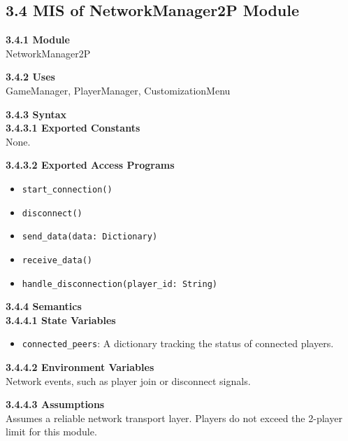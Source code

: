 \documentclass[12pt, titlepage]{article}
\begin{document}
\subsection*{3.4 MIS of NetworkManager2P Module}
\textbf{3.4.1 Module}\\
NetworkManager2P

\textbf{3.4.2 Uses}\\
GameManager, PlayerManager, CustomizationMenu

\textbf{3.4.3 Syntax}\\
\textbf{3.4.3.1 Exported Constants}\\
None.  

\textbf{3.4.3.2 Exported Access Programs}
\begin{itemize}
    \item \texttt{start\_connection()}
    \item \texttt{disconnect()}
    \item \texttt{send\_data(data: Dictionary)}
    \item \texttt{receive\_data()}
    \item \texttt{handle\_disconnection(player\_id: String)}
\end{itemize}

\textbf{3.4.4 Semantics}\\
\textbf{3.4.4.1 State Variables}\\
\begin{itemize}
    \item \texttt{connected\_peers}: A dictionary tracking the status of connected players.
\end{itemize}

\textbf{3.4.4.2 Environment Variables}\\
Network events, such as player join or disconnect signals.

\textbf{3.4.4.3 Assumptions}\\
Assumes a reliable network transport layer. Players do not exceed the 2-player limit for this module.
\end{document}
